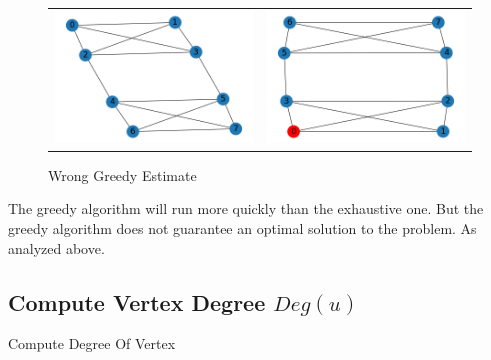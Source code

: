 \documentclass[longpaper, english, final, times]{revdetua}
\begin{document}
		\begin{figure}[h]
			\begin{tabular}{cc}
				\includegraphics[width=0.5\linewidth]{imgs/greedycont1.png} &   \includegraphics[width=0.5\linewidth]{imgs/greedycont2.png} \\
			\end{tabular}
			\caption{Wrong Greedy Estimate}
			\label{figure:greedysearchwrong1}
		\end{figure}
		
		The greedy algorithm will run more quickly than the exhaustive one. But the greedy algorithm does not guarantee an optimal solution to the problem. As analyzed above.
		
		\subsection{Compute Vertex Degree $Deg(u)$}
			\begin{algorithm}
				\caption{Compute Degree Of Vertex}
				\label{algorithm:GetVertexDegree}
				\DontPrintSemicolon
				
				
				
				
			\end{algorithm}
				
\end{document}
